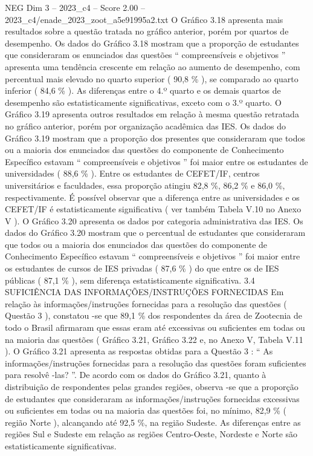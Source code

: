 \begin{textsample}{NEG Dim 3 – 2023\_c4 – Score 2.00 – 2023\_c4/enade\_2023\_zoot\_a5e91995a2.txt}
O Gráfico 3.18 apresenta mais resultados sobre a questão tratada no gráfico anterior, porém por quartos de desempenho.
Os dados do Gráfico 3.18 mostram que a proporção de estudantes que consideraram os enunciados das questões “ compreensíveis e objetivos ” apresenta uma tendência crescente em relação ao aumento de desempenho, com percentual mais elevado no quarto superior ( 90,8 \% ), se comparado ao quarto inferior ( 84,6 \% ).
As diferenças entre o 4.º quarto e os demais quartos de desempenho são estatisticamente significativas, exceto com o 3.º quarto.
O Gráfico 3.19 apresenta outros resultados em relação à mesma questão retratada no gráfico anterior, porém por organização acadêmica das IES.
Os dados do Gráfico 3.19 mostram que a proporção dos presentes que consideraram que todos ou a maioria dos enunciados das questões do componente de Conhecimento Específico estavam “ compreensíveis e objetivos ” foi maior entre os estudantes de universidades ( 88,6 \% ).
Entre os estudantes de CEFET/IF, centros universitários e faculdades, essa proporção atingiu 82,8 \%, 86,2 \% e 86,0 \%, respectivamente.
É possível observar que a diferença entre as universidades e os CEFET/IF é estatisticamente significativa ( ver também Tabela V.10 no Anexo V ).
O Gráfico 3.20 apresenta os dados por categoria administrativa das IES.
Os dados do Gráfico 3.20 mostram que o percentual de estudantes que consideraram que todos ou a maioria dos enunciados das questões do componente de Conhecimento Específico estavam “ compreensíveis e objetivos ” foi maior entre os estudantes de cursos de IES privadas ( 87,6 \% ) do que entre os de IES públicas ( 87,1 \% ), sem diferença estatisticamente significativa. 3.4 SUFICIÊNCIA DAS INFORMAÇÕES/INSTRUÇÕES FORNECIDAS Em relação às informações/instruções fornecidas para a resolução das questões ( Questão 3 ), constatou -se que 89,1 \% dos respondentes da área de Zootecnia de todo o Brasil afirmaram que essas eram até excessivas ou suficientes em todas ou na maioria das questões ( Gráfico 3.21, Gráfico 3.22 e, no Anexo V, Tabela V.11 ).
O Gráfico 3.21 apresenta as respostas obtidas para a Questão 3 : “ As informações/instruções fornecidas para a resolução das questões foram suficientes para resolvê -las? ”.
De acordo com os dados do Gráfico 3.21, quanto à distribuição de respondentes pelas grandes regiões, observa -se que a proporção de estudantes que consideraram as informações/instruções fornecidas excessivas ou suficientes em todas ou na maioria das questões foi, no mínimo, 82,9 \% ( região Norte ), alcançando até 92,5 \%, na região Sudeste.
As diferenças entre as regiões Sul e Sudeste em relação as regiões Centro-Oeste, Nordeste e Norte são estatisticamente significativas.

\end{textsample}
